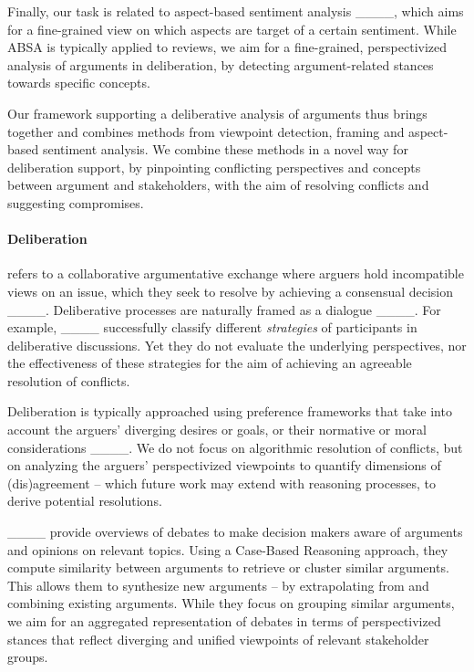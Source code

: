 Finally, our task is related to aspect-based sentiment analysis ____, which aims for a fine-grained view on which aspects are target of a certain sentiment. 
While ABSA is typically applied to reviews, we aim for a fine-grained, perspectivized analysis of arguments in deliberation, by detecting argument-related stances towards specific concepts. 

Our framework supporting a deliberative analysis of arguments thus brings together and combines methods from viewpoint detection, framing and aspect-based sentiment analysis. We combine these methods in a novel way for deliberation support, by pinpointing conflicting perspectives and concepts between argument and stakeholders, with the aim of resolving conflicts and suggesting compromises. 

\paragraph{Deliberation} 
refers to a collaborative argumentative exchange where arguers hold incompatible views on an issue, which they seek to resolve by achieving a consensual decision ____. Deliberative processes are naturally framed as a dialogue ____. %
For example, ____ successfully classify different \textit{strategies} of participants
in deliberative discussions. Yet they do not evaluate the underlying perspectives, nor the effectiveness of these strategies for the aim of achieving an agreeable resolution of conflicts. 


Deliberation is typically approached using pre\-fer\-ence frameworks that take into account the arguers' diverging desires or goals, or their normative or moral considerations ____. We do not focus on algorithmic resolution of conflicts, but on analyzing the arguers' perspectivized viewpoints to quantify dimensions of (dis)agreement -- which future work may extend with reasoning processes, to derive potential resolutions. 

____ provide overviews of debates to make decision makers aware of arguments and opinions on relevant topics. Using a Case-Based Reasoning approach, they compute similarity between arguments to retrieve or cluster similar arguments. This allows them to synthesize new arguments -- by extrapolating from and combining existing arguments. 
While they focus on grouping similar arguments, we aim for an aggregated representation of debates in terms of perspectivized stances that reflect diverging and unified viewpoints of relevant stakeholder groups.

